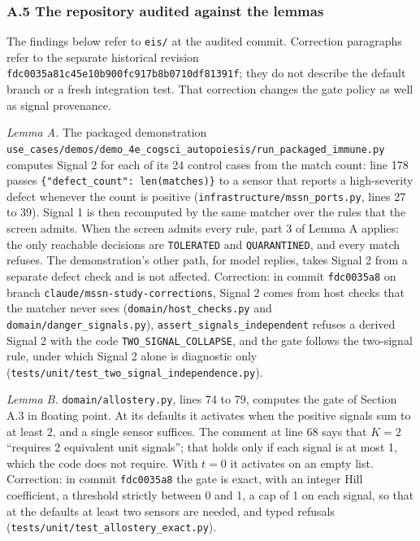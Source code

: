 \documentclass[
  11pt,
]{article}
\newcommand{\passthrough}[1]{#1}
\begin{document}
\hypertarget{a.5-the-repository-audited-against-the-lemmas}{%
\subsubsection{A.5 The repository audited against the
lemmas}\label{a.5-the-repository-audited-against-the-lemmas}}

The findings below refer to
\texttt{\nolinkurl{eis/}} at
the audited commit. Correction paragraphs refer to the separate
historical revision
\texttt{\nolinkurl{fdc0035a81c45e10b900fc917b8b0710df81391f}}; they
do not describe the default branch or a fresh integration test. That
correction changes the gate policy as well as signal provenance.

\emph{Lemma A.} The packaged demonstration
\texttt{\nolinkurl{use_cases/demos/demo_4e_cogsci_autopoiesis/run_packaged_immune.py}}
computes Signal 2 for each of its 24 control cases from the match count:
line 178 passes
\texttt{\{"defect\_count": len(matches)\}} to a sensor
that reports a high-severity defect whenever the count is positive
(\texttt{\nolinkurl{infrastructure/mssn_ports.py}}, lines 27 to
39). Signal 1 is then recomputed by the same matcher over the rules that
the screen admits. When the screen admits every rule, part 3 of Lemma A
applies: the only reachable decisions are
\passthrough{\lstinline!TOLERATED!} and
\passthrough{\lstinline!QUARANTINED!}, and every match refuses. The
demonstration's other path, for model replies, takes Signal 2 from a
separate defect check and is not affected. Correction: in commit
\passthrough{\lstinline!fdc0035a8!} on branch
\texttt{\nolinkurl{claude/mssn-study-corrections}}, Signal 2 comes
from host checks that the matcher never sees
(\texttt{\nolinkurl{domain/host_checks.py}} and
\texttt{\nolinkurl{domain/danger_signals.py}}),
\texttt{\nolinkurl{assert_signals_independent}} refuses a derived
Signal 2 with the code \texttt{\nolinkurl{TWO_SIGNAL_COLLAPSE}},
and the gate follows the two-signal rule, under which Signal 2 alone is
diagnostic only
(\texttt{\nolinkurl{tests/unit/test_two_signal_independence.py}}).

\emph{Lemma B.} \texttt{\nolinkurl{domain/allostery.py}}, lines 74
to 79, computes the gate of Section A.3 in floating point. At its
defaults it activates when the positive signals sum to at least 2, and a
single sensor suffices. The comment at line 68 says that \(K = 2\)
``requires 2 equivalent unit signals''; that holds only if each signal
is at most 1, which the code does not require. With \(t = 0\) it
activates on an empty list. Correction: in commit
\passthrough{\lstinline!fdc0035a8!} the gate is exact, with an integer
Hill coefficient, a threshold strictly between 0 and 1, a cap of 1 on
each signal, so that at the defaults at least two sensors are needed,
and typed refusals
(\texttt{\nolinkurl{tests/unit/test_allostery_exact.py}}).
\end{document}
